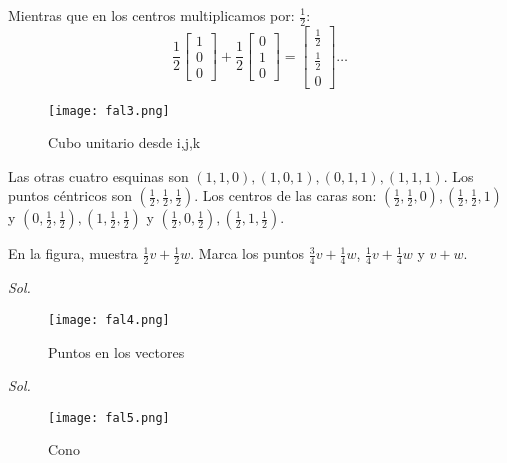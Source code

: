 Mientras que en los centros multiplicamos por: $\frac{1}{2}$:
\begin{equation*}
	\frac{1}{2}\begin{bmatrix} 1\\ 0\\ 0 \end{bmatrix} + \frac{1}{2}\begin{bmatrix} 0\\ 1\\ 0 \end{bmatrix}= \begin{bmatrix} \frac{1}{2}\\ \frac{1}{2}\\ 0 \end{bmatrix}\ldots
\end{equation*}

\begin{figure}[h!]
	\centerline{\texttt{[image: fal3.png]}}
	\caption{Cubo unitario desde i,j,k}
	\label{fal3}
\end{figure}

Las otras cuatro esquinas son $(1,1,0), (1,0,1), (0,1,1), (1,1,1)$. Los puntos céntricos son $(\frac{1}{2},\frac{1}{2}, \frac{1}{2})$.
Los centros de las caras son: $(\frac{1}{2}, \frac{1}{2}, 0), \left(\frac{1}{2}, \frac{1}{2}, 1\right)$ y $\left(0, \frac{1}{2}, \frac{1}{2}\right), \left(1, \frac{1}{2}, \frac{1}{2}\right)$ y $\left(\frac{1}{2}, 0, \frac{1}{2}\right), \left(\frac{1}{2}, 1, \frac{1}{2}\right)$.

\begin{problem}En la figura, muestra $\frac{1}{2}v + \frac{1}{2}w$. Marca los puntos $\frac{3}{4}v + \frac{1}{4}w$,
$\frac{1}{4}v + \frac{1}{4}w$ y $v+w$.
\end{problem}

\textit{ Sol. }

\begin{figure}[h!]
	\centerline{\texttt{[image: fal4.png]}}
	\caption{Puntos en los vectores}
	\label{fal4}
\end{figure}

\begin{problem}
\end{problem}

\textit{ Sol. }
\begin{figure}[h!]
	\centerline{\texttt{[image: fal5.png]}}
	\caption{Cono}
	\label{fal5}
\end{figure}

